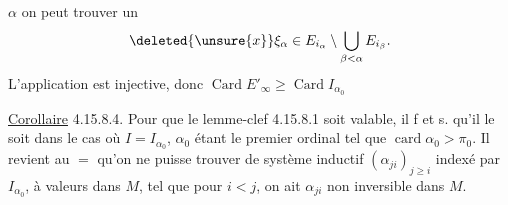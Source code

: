 
$\alpha$  on peut trouver un
\[
\deleted{\unsure{x}}\xi_\alpha\in E_{i_\alpha}\setminus\bigcup_{\beta<\alpha}E_{i_\beta}.
\]
L'application
est injective, donc $\operatorname{Card} E'_\infty\geq\operatorname{Card} I_{\alpha_0}$

\uline{Corollaire} 4.15.8.4. Pour  que le lemme-clef 4.15.8.1 soit valable, il f et s.
\noindent\makebox[0pt][r]{\smash{\rule[-10\baselineskip]{0.4pt}{10\baselineskip}}\quad}qu'il le soit  dans le cas où $I=I_{\alpha_0}$, $\alpha_0$ étant le premier ordinal tel que $\operatorname{card}\alpha_0>\pi_0$.
Il revient au $=$ qu'on ne puisse trouver de système inductif $(\alpha_{ji})_{j\geq i}$ indexé par $I_{\alpha_0}$, à valeurs dans $M$, tel que pour  $i<j$, on ait $\alpha_{ji}$ non inversible dans $M$.
